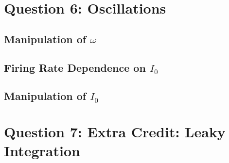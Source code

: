 \documentclass[11pt, oneside]{article}
\begin{document}
\section{Question 6: Oscillations}

\subsection{Manipulation of $\omega$}

\subsection{Firing Rate Dependence on $I_0$}

\subsection{Manipulation of $I_0$}

\section{Question 7: Extra Credit: Leaky Integration}
\end{document}
